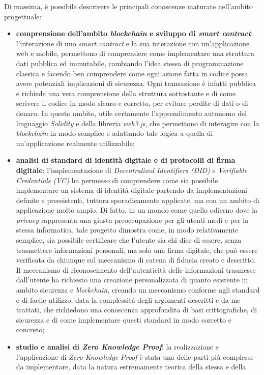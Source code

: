 Di massima, è possibile descrivere le principali conoscenze maturate nell'ambito progettuale:
\begin{itemize}[noitemsep,topsep=2pt]
    \item \textbf{comprensione dell'ambito \textit{blockchain} e sviluppo di \textit{smart contract}}: l'interazione di uno \textit{smart contract} e la sua interazione con un'applicazione web e mobile,
    permettono di comprendere come implementare una struttura dati pubblica ed immutabile, cambiando l'idea stessa di programmazione classica e facendo ben comprendere
    come ogni azione fatta in codice possa avere potenziali implicazioni di sicurezza. Ogni transazione è infatti pubblica e richiede una vera comprensione della struttura sottostante 
    e di come scrivere il codice in modo sicuro e corretto, per evitare perdite di dati o di denaro. In questo ambito, utile certamente l'apprendimento autonomo del linguaggio \textit{Solidity} e della libreria \textit{web3.js},
    che permettono di interagire con la \textit{blockchain} in modo semplice e adattando tale logica a quella di un'applicazione realmente utilizzabile;
    \item \textbf{analisi di standard di identità digitale e di protocolli di firma digitale}: l'implementazione di \textit{Decentralized Identifiers (DID)} e \textit{Verifiable Credentials (VC)} ha permesso di comprendere come sia possibile implementare un sistema di identità digitale
    partendo da implementazioni definite e preesistenti, tuttora sporadicamente applicate, ma con un ambito di applicazione molto ampio. Di fatto, in un mondo come quello odierno dove la \textit{privacy} rappresenta una giusta preoccupazione per gli utenti medi e per la stessa informatica,
    tale progetto dimostra come, in modo relativamente semplice, sia possibile certificare che l'utente sia chi dice di essere, senza trasmettere informazioni personali, ma solo una firma digitale, che può essere verificata da chiunque sul meccanismo di catena di fiducia
    creato e descritto. Il meccanismo di riconoscimento dell'autenticità delle informazioni trasmesse dall'utente ha richiesto una creazione personalizzata di quanto esistente in ambito sicurezza e \textit{blockchain}, creando un meccanismo conforme agli standard 
    e di facile utilizzo, data la complessità degli argomenti descritti e da me trattati, che richiedono una conoscenza approfondita di basi crittografiche, di sicurezza e di come implementare questi standard in modo corretto e concreto;
    \item \textbf{studio e analisi di \textit{Zero Knowledge Proof}}: la realizzazione e l'applicazione di \textit{Zero Knowledge Proof} è stata una delle parti più complesse da implementare, data la natura estremamente teorica della stessa e della 

\end{itemize}

